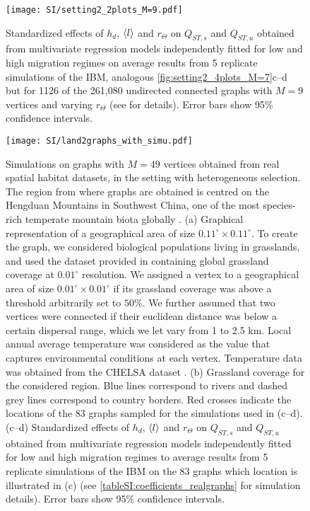 \begin{figure}[t]
  \centerline{
      \texttt{[image: SI/setting2\_2plots\_M=9.pdf]} 
  }
  \caption{Standardized effects of $h_d$, $\langle l \rangle$ and $r_\Theta$ on $Q_{ST,s}$ and $Q_{ST,u}$ obtained from multivariate regression models independently fitted for low and high migration regimes on average results from 5 replicate simulations of the IBM, analogous \cref{fig:setting2_4plots_M=7}c--d but for 1126 of the 261,080 undirected connected graphs with $M=9$ vertices and varying $r_\Theta$ (see  for details). Error bars show 95\% confidence intervals.
}
  \label{figSI:setting2_2plots_M=9}
\end{figure}
\FloatBarrier

\begin{figure}[!ht]
  \centerline{
      \texttt{[image: SI/land2graphs\_with\_simu.pdf]} 
  }
  \caption{\small Simulations on graphs with $M=49$ vertices obtained from real spatial habitat datasets, in the setting with heterogeneous selection. The region from where graphs are obtained is centred on the Hengduan Mountains in Southwest China, one of the most species-rich temperate mountain biota globally \citep{Ding2020a}.
  (a) Graphical representation of a geographical area of size $ 0.11^{\circ} \times 0.11^{\circ}$. To create the graph, we considered biological populations living in grasslands, and used the dataset provided in \citep{Jung2020} containing global grassland coverage at $0.01^\circ$ resolution. We assigned a vertex to a geographical area of size $ 0.01^{\circ} \times 0.01^{\circ}$ if its grassland coverage was above a threshold arbitrarily set to $50\%$. We further assumed that two vertices were connected if their euclidean distance was below a certain dispersal range, which we let vary from 1 to 2.5 km. Local annual average temperature was considered as the value that captures environmental conditions at each vertex. Temperature data was obtained from the CHELSA dataset \citep{Karger2017}.
  (b) Grassland coverage for the considered region. Blue lines correspond to rivers and dashed grey lines correspond to country borders. Red crosses indicate the locations of the 83 graphs sampled for the simulations used in (c--d).
  (c--d) Standardized effects of $h_d$, $\langle l \rangle$ and $r_\Theta$ on $Q_{ST,s}$ and $Q_{ST,u}$ obtained from multivariate regression models independently fitted for low and high migration regimes to average results from 5 replicate simulations of the IBM on the 83 graphs which location is illustrated in (c) (see \cref{tableSI:coefficients_realgraphs} for simulation details). Error bars show 95\% confidence intervals.}
  \label{figSI:graph_real_land}
\end{figure}
\FloatBarrier



